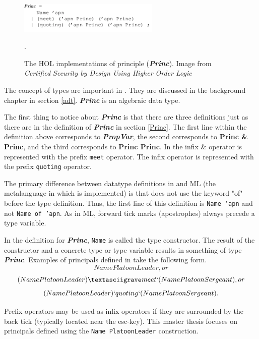 \documentclass[../../main/main.tex]{subfiles}
\begin{document}
\begin{figure}[h]
\centering
\includegraphics[width=0.6\textwidth]{../figures/princHOL}
\caption{\label{princHOL}The HOL implementations of principle (\textbf{\textit{Princ}}).  Image from  \textit{Certified Security by Design Using Higher Order Logic}\cite{certmanual}}.  
\end{figure}

The concept of types are important in .  They are discussed in the background chapter in section \ref{adt}.  \textbf{\textit{Princ}} is an algebraic data type.  

The first thing to notice about  \textbf{\textit{Princ}} is that there are three definitions just as there are in the definition of  \textbf{\textit{Princ}} in section \ref{Princ}.   The first line within the definition above corresponds to \textbf{\textit{PropVar}}, the second corresponds to \textbf{Princ \& Princ}, and the third corresponds to \textbf{Princ \textbar  Princ}.  In  the infix \& operator is represented with the prefix \texttt{meet} operator.  The infix \textbar operator is represented with the prefix \texttt{quoting} operator.

The primary difference between datatype definitions in  and ML (the metalanguage in which  is implemented) is that  does not use the keyword "of" before the type definition.  Thus, the first line of this definition is \texttt{Name 'apn} and not \texttt{Name of 'apn}.  As in ML, forward tick marks (apostrophes) always precede a type variable. 


In the definition for  \textbf{\textit{Princ}}, \texttt{Name} is called the type constructor.  The result of the constructor and a concrete type or type variable results in something of type \textbf{\textit{Princ}}.  Examples of principals defined in  take the following form.
\[Name PlatoonLeader, or \]
\[(Name PlatoonLeader) \textasciigrave meet ` (Name PlatoonSergeant), or \]
\[(Name PlatoonLeader) `quoting` (Name PlatoonSergeant). \]

Prefix operators may be used as infix operators if they are surrounded by the back tick (typically located near the esc-key). This master thesis focuses on principals defined using the \texttt{Name PlatoonLeader} construction. 
\end{document}
